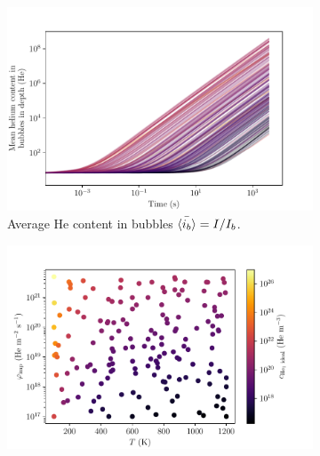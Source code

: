 \begin{figure} [ht!]
    \begin{subfigure}{0.5\linewidth}
        \centering
        \includegraphics[width=\linewidth]{Figures/Chapter4/parametric study/mean_ib_time.pdf}
        \caption{Average He content in bubbles $\Bar{\langle i_b \rangle} = I / I_b$.}
        \label{fig: mean ib time}
    \end{subfigure}%
    \begin{subfigure}{0.5\linewidth}
        \centering
        \includegraphics[width=\linewidth]{Figures/Chapter4/parametric study/points_with_parameter.pdf}

\end{subfigure}
\end{figure}
